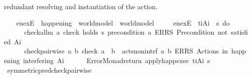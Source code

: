 \begin{isabellebody}
\begin{isamarkuptext}
    redundant resolving and instantiation of the action.%
\end{isamarkuptext}\isamarkuptrue%
\ \ \isamarkupfalse%
\ en{\isacharunderscore}{\kern0pt}exE\ {\isacharcolon}{\kern0pt}{\isacharcolon}{\kern0pt}\ {\isachardoublequoteopen}happening\ {\isasymRightarrow}\ world{\isacharunderscore}{\kern0pt}model\ {\isasymRightarrow}\ {\isacharunderscore}{\kern0pt}{\isacharplus}{\kern0pt}world{\isacharunderscore}{\kern0pt}model{\isachardoublequoteclose}\ \isanewline
\ \ \ \ {\isachardoublequoteopen}en{\isacharunderscore}{\kern0pt}exE\ {\isasymequiv}\ {\isasymlambda}{\isacharparenleft}{\kern0pt}t\isactrlsub i{\isacharcomma}{\kern0pt}A\isactrlsub i{\isacharparenright}{\kern0pt}\ {\isasymRightarrow}\ {\isasymlambda}s{\isachardot}{\kern0pt}\ do\ {\isacharbraceleft}{\kern0pt}\isanewline
\ \ \ \ \ \ check{\isacharunderscore}{\kern0pt}allm\ {\isacharparenleft}{\kern0pt}{\isasymlambda}a{\isachardot}{\kern0pt}\ check\ {\isacharparenleft}{\kern0pt}holds\ s\ {\isacharparenleft}{\kern0pt}precondition\ a{\isacharparenright}{\kern0pt}{\isacharparenright}{\kern0pt}\ {\isacharparenleft}{\kern0pt}ERRS\ {\isacharprime}{\kern0pt}{\isacharprime}{\kern0pt}Precondition\ not\ satisfied{\isacharprime}{\kern0pt}{\isacharprime}{\kern0pt}{\isacharparenright}{\kern0pt}{\isacharparenright}{\kern0pt}\ A\isactrlsub i{\isacharsemicolon}{\kern0pt}\isanewline
\ \ \ \ \ \ check{\isacharunderscore}{\kern0pt}pairwise\ {\isacharparenleft}{\kern0pt}{\isasymlambda}a\ b{\isachardot}{\kern0pt}\ check\ {\isacharparenleft}{\kern0pt}a\ {\isasymnoteq}\ b\ {\isasymlongrightarrow}\ acts{\isacharunderscore}{\kern0pt}non{\isacharunderscore}{\kern0pt}intrf\ a\ b{\isacharparenright}{\kern0pt}\ {\isacharparenleft}{\kern0pt}ERRS\ {\isacharprime}{\kern0pt}{\isacharprime}{\kern0pt}Actions\ in\ happening\ interfering{\isacharprime}{\kern0pt}{\isacharprime}{\kern0pt}{\isacharparenright}{\kern0pt}{\isacharparenright}{\kern0pt}\ A\isactrlsub i{\isacharsemicolon}{\kern0pt}\isanewline
\ \ \ \ \ \ Error{\isacharunderscore}{\kern0pt}Monad{\isachardot}{\kern0pt}return\ {\isacharparenleft}{\kern0pt}apply{\isacharunderscore}{\kern0pt}happ{\isacharunderscore}{\kern0pt}exec\ {\isacharparenleft}{\kern0pt}t\isactrlsub i{\isacharcomma}{\kern0pt}A\isactrlsub i{\isacharparenright}{\kern0pt}\ s{\isacharparenright}{\kern0pt}\isanewline
\ \ \ \ {\isacharbraceright}{\kern0pt}{\isachardoublequoteclose}\isanewline
\isanewline
\ \ \isamarkupfalse%
\ symmetric{\isacharunderscore}{\kern0pt}pred{\isacharunderscore}{\kern0pt}check{\isacharunderscore}{\kern0pt}pairwise{\isacharcolon}{\kern0pt}\isanewline

\end{isabellebody}
